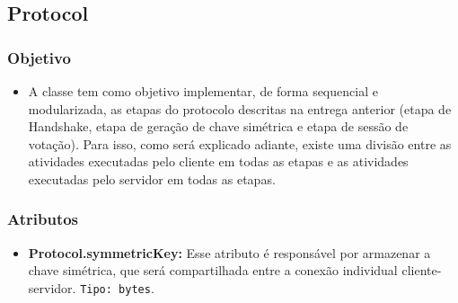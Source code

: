 \documentclass[10pt]{article}
\begin{document}
\begin{itemize}
    \subsection{\Large Protocol}
        \subsubsection{\large Objetivo}
            \begin{itemize}
            \item A classe tem como objetivo implementar, de forma sequencial e modularizada, as etapas do protocolo descritas na entrega anterior (etapa de Handshake, etapa de geração de chave simétrica e etapa de sessão de votação). Para isso, como será explicado adiante, existe uma divisão entre as atividades executadas pelo cliente em todas as etapas e as atividades executadas pelo servidor em todas as etapas.
            \end{itemize}
        \subsubsection{\large Atributos}
            \begin{itemize}
            \item \textbf{Protocol.symmetricKey:}  Esse atributo é responsável por armazenar a chave simétrica, que será compartilhada entre a conexão individual cliente-servidor. \texttt{Tipo: bytes}.
            \end{itemize}

\end{itemize}
\end{document}
